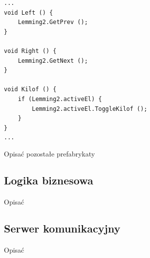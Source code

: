 \begin{lstlisting}[language=CSharp]
...
void Left () {
	Lemming2.GetPrev ();
}

void Right () {
	Lemming2.GetNext ();
}

void Kilof () {
	if (Lemming2.activeEl) {
		Lemming2.activeEl.ToggleKilof ();
	}
}
...
\end{lstlisting}


{\color{red}Opisać pozostałe prefabrykaty}

\subsection{Logika biznesowa}
\paragraph{}
{\color{red}Opisać}

\subsection{Serwer komunikacyjny}
\paragraph{}
{\color{red}Opisać}